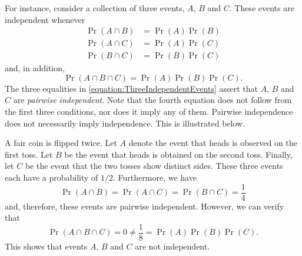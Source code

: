 For instance, consider a collection of three events, $A$, $B$ and $C$.
These events are independent whenever
\begin{equation} \label{equation:ThreeIndependentEvents}
\begin{split}
\Pr (A \cap B) &= \Pr (A) \Pr (B) \\
\Pr (A \cap C) &= \Pr (A) \Pr (C) \\
\Pr (B \cap C) &= \Pr (B) \Pr (C)
\end{split}
\end{equation}
and, in addition,
\begin{equation*}
\Pr (A \cap B \cap C) = \Pr (A) \Pr (B) \Pr(C) .
\end{equation*}
The three equalities in \eqref{equation:ThreeIndependentEvents} assert that $A$, $B$ and $C$ are \emph{pairwise independent}.
Note that the fourth equation does not follow from the first three conditions, nor does it imply any of them.
Pairwise independence does not necessarily imply independence.
This is illustrated below.

\begin{example}
A fair coin is flipped twice.
Let $A$ denote the event that heads is observed on the first toss.
Let $B$ be the event that heads is obtained on the second toss.
Finally, let $C$ be the event that the two tosses show distinct sides.
These three events each have a probability of $1/2$.
Furthermore, we have
\begin{equation*}
\Pr (A \cap B) = \Pr (A \cap C) = \Pr (B \cap C) = \frac{1}{4}
\end{equation*}
and, therefore, these events are pairwise independent.
However, we can verify that
\begin{equation*}
\Pr (A \cap B \cap C) = 0 \neq \frac{1}{8} = \Pr (A) \Pr (B) \Pr (C) .
\end{equation*}
This shows that events $A$, $B$ and $C$ are not independent.
\end{example}

